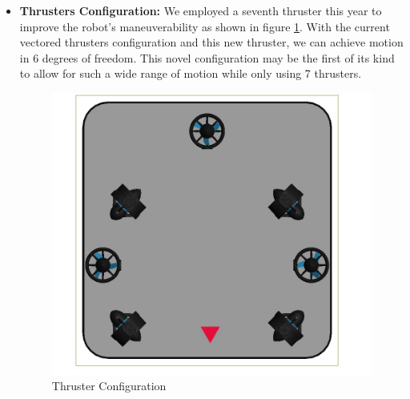\begin{itemize}[leftmargin=0pt, itemindent=10pt]
    \setlength{\itemsep}{0pt}   
    \item \textbf{Thrusters Configuration:} We employed a seventh thruster this year to improve the robot's maneuverability as shown in figure \ref{fig:thruster}. With the current vectored thrusters configuration and this new thruster, we can achieve motion in 6 degrees of freedom. This novel configuration may be the first of its kind to allow for such a wide range of motion while only using 7 thrusters.
    \begin{figure}[h]
        \centering
        \includegraphics[width=0.8\columnwidth]{Sections/2Design Rationale/images/Thrusters.png}
        \caption{Thruster Configuration}
        \label{fig:thruster}
    \end{figure}


\end{itemize}

